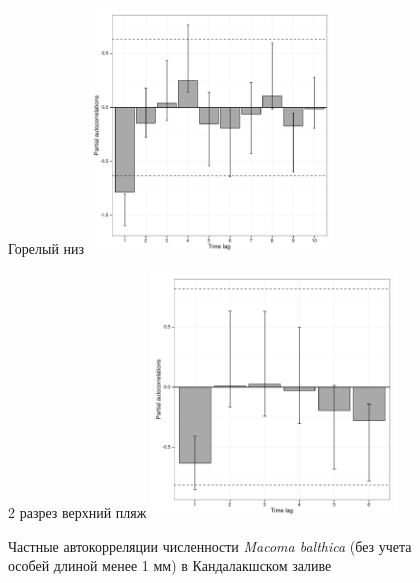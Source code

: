 \documentclass[12pt, a4paper]{disser}
\begin{document}
\begin{figure}[ht]
	\begin{minipage}[b]{.46\linewidth}
	\begin{center}
	{\tiny Горелый низ}
	\includegraphics[width=65mm]{../White_Sea/dynamic_N_N1/boot_PRCF_Goreliy_low_.pdf}
	\end{center}
	\end{minipage}
%
	\hfil %
%
	\begin{minipage}[b]{.46\linewidth}
	\begin{center}
	{\tiny 2 разрез верхний пляж}
	\includegraphics[width=65mm]{../White_Sea/dynamic_N_N1/boot_PRCF_razrez2_high_beatch_.pdf}
	\end{center}
	\end{minipage}

	\caption{Частные автокорреляции численности {\it Macoma balthica} (без учета особей длиной менее 1 мм) в Кандалакшском заливе}
	\label{ris:boot_PRCF_Kandalaksha_N2}
	\end{figure}
\end{document}
